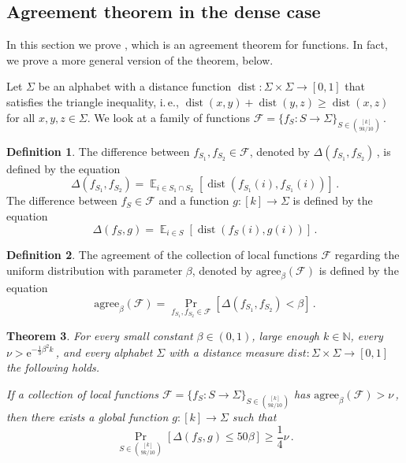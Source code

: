 \documentclass[11pt]{article}
\numberwithin{equation}{section}
\newtheorem{theorem}{Theorem}[section]
\theoremstyle{definition}
\newtheorem{definition}[theorem]{Definition}
\theoremstyle{plain}
\newcommand{\eee}{\mathrm e}
\newcommand{\ie}{i.\,e.}
\newcommand{\Prob}[2][]{\Pr_{{#1}}\left[#2\right]} %
\DeclareMathOperator*{\E}{\mathbb{E}} %
\newcommand{\set}[1]{\{#1\}} %
\newcommand\setf{f} %
\newcommand{\g}{g} %
\newcommand\pf{g} %
\DeclareMathOperator{\dist}{dist} %
\newcommand{\diff}{\Delta} %
\begin{document}
\subsection{Agreement theorem in the dense case}\label{sec:build}
In this section we prove , which is an agreement theorem for functions. 
In fact, we prove a more general version of the theorem,  below.

Let $\Sigma$ be an alphabet with a distance function $\dist:\Sigma\times\Sigma\rightarrow[0,1]$ that satisfies the triangle inequality, \ie, $\dist(x,y) + \dist(y,z) \ge \dist(x,z)$ for all $x,y,z\in \Sigma$.
%
We look at a family of functions $\mathcal{F} = \set{f_S:S\rightarrow\Sigma}_{S\in\binom{[k]}{9k/10}}$\,.
\begin{definition}
  The difference between $\setf_{S_1},\setf_{S_2}\in \mathcal{F}$, denoted by $\diff(\setf_{S_1},\setf_{S_2})$\,,  %
is defined by
the equation    %
	\[ \diff(\setf_{S_1},\setf_{S_2}) = \E_{i\in S_1\cap S_2}[\dist(\setf_{S_1}(i),\setf_{S_1}(i))]\,. \] %
The difference between $\setf_S\in\mathcal{F}$ 
%
and  %
a function $\pf:[k]\rightarrow\Sigma$ is %
defined by the equation  %
	\[ \diff(\setf_S,\g) = \E_{i\in S}[\dist(\setf_S(i),\pf(i))]\,. \]%
\end{definition}


\begin{definition}
  The agreement of the collection of local functions $\mathcal{F}$ regarding the uniform distribution with parameter $\beta$, denoted by $\text{agree}_\beta(\mathcal{F})$ is %
defined by the equation
	\[ \text{agree}_\beta(\mathcal{F}) = \Pr_{\setf_{S_1},\setf_{S_2}\in\mathcal{F}}[\diff(\setf_{S_1},\setf_{S_2}) < \beta] \,.\]%
\end{definition}

\begin{theorem}\label{thm:sets-general}
	For every small constant $\beta\in (0,1)$, large enough $k\in\mathbb{N}$, every $\nu > \eee^{-\frac{1}{3}\beta^2 k}$\,, and every alphabet $\Sigma$ with a distance measure $dist:\Sigma\times\Sigma\rightarrow [0,1]$ the following holds.
	
	If a collection of local functions $\mathcal{F} = \set{\setf_S:S\rightarrow \Sigma}_{S\in\binom{[k]}{9k/10}}$ has $\text{agree}_\beta(\mathcal{F})> \nu$\,, then there exists a global function $\pf:[k]\rightarrow\Sigma$ such that
	\[ \Prob[S\in\binom{[k]}{9k/10}]{{\diff(\setf_S,\g)} \leq 50\beta} \geq \frac{1}{4}\nu\,. \]%
\end{theorem} 	
\end{document}
